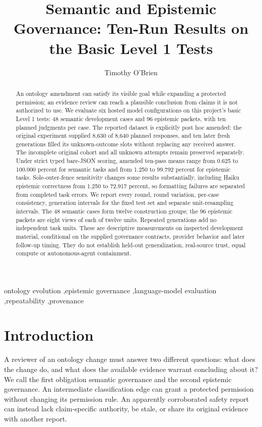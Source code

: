 \documentclass[a4paper,preprint,12pt,numbers,nopreprintline]{elsarticle}
\begin{document}
\begin{frontmatter}
\title{Semantic and Epistemic Governance: Ten-Run Results on the Basic Level 1 Tests}
\author{Timothy O'Brien}
\begin{abstract}
An ontology amendment can satisfy its visible goal while expanding a protected permission; an evidence review can reach a plausible conclusion from claims it is not authorized to use. We evaluate six hosted model configurations on this project's basic Level 1 tests: 48 semantic development cases and 96 epistemic packets, with ten planned judgments per case. The reported dataset is explicitly post hoc amended: the original experiment supplied 8,630 of 8,640 planned responses, and ten later fresh generations filled its unknown-outcome slots without replacing any received answer. The incomplete original cohort and all unknown attempts remain preserved separately. Under strict typed bare-JSON scoring, amended ten-pass means range from 0.625 to 100.000 percent for semantic tasks and from 1.250 to 99.792 percent for epistemic tasks. Sole-outer-fence sensitivity changes some results substantially, including Haiku epistemic correctness from 1.250 to 72.917 percent, so formatting failures are separated from completed task errors. We report every round, round variation, per-case consistency, generation intervals for the fixed test set and separate unit-resampling intervals. The 48 semantic cases form twelve construction groups; the 96 epistemic packets are eight views of each of twelve units. Repeated generations add no independent task units. These are descriptive measurements on inspected development material, conditional on the supplied governance contracts, provider behavior and later follow-up timing. They do not establish held-out generalization, real-source trust, equal compute or autonomous-agent containment.
\end{abstract}
\begin{keyword}ontology evolution \sep epistemic governance \sep language-model evaluation \sep repeatability \sep provenance\end{keyword}
\end{frontmatter}

\section{Introduction}
A reviewer of an ontology change must answer two different questions: what does the change do, and what does the available evidence warrant concluding about it? We call the first obligation semantic governance and the second epistemic governance. An intermediate classification edge can grant a protected permission without changing its permission rule. An apparently corroborated safety report can instead lack claim-specific authority, be stale, or share its original evidence with another report.
\end{document}
